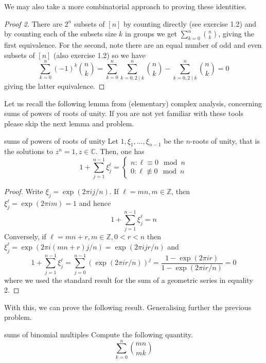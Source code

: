 \documentclass{article}
\begin{document}
We may also take a more combinatorial approach to proving these identities. 

\begin{proof}[Proof 2]
    There are $2^n$ subsets of $[n]$ by counting directly (see exercise 1.2) and by counting each of the subsets size $k$ in groups we get 
    $\sum_{k=0}^n \binom{n}{k}$, giving the first equivalence. For the second, note there are an equal number of odd and even subsets of $[n]$ 
    (also exercise 1.2) so we have 
    \[\sum_{k=0}^n (-1)^k \binom{n}{k} = \sum_{k=0}^n\sum_{k=0, 2 \mid k}^n \binom{n}{k} - \sum_{k=0, 2 \mid k}^{n} \binom{n}{k} = 0\]
    giving the latter equivalence.
\end{proof}

Let us recall the following lemma from (elementary) complex analysis, concerning sums of powers of roots of unity. If you are not yet familiar 
with these tools please skip the next lemma and problem.

\begin{lemma}[]{sums of powers of roots of unity}
    Let $1, \xi_1, \dots, \xi_{n-1}$ be the $n$-roots of unity, that is the solutions to $z^n = 1, z \in \mathbb{C}$. Then, one has 
    \[1 + \sum_{j=1}^{n-1} \xi_j^\ell = \begin{cases}n : \ell \equiv 0 \mod n \\ 0 : \ell \not\equiv 0 \mod n\end{cases}\]
\end{lemma}

\begin{proof}
    Write $\xi_j = \exp(2\pi i j/n)$. If $\ell = mn, m \in \mathbb{Z}$, then $\xi_j^\ell = \exp(2\pi i m) = 1$ and hence
    \[1 + \sum_{j=1}^{n-1}\xi_j^\ell = n\] 
    Conversely, if $\ell = mn + r, m \in \mathbb{Z}, 0 < r < n$ then $\xi_j^\ell = \exp(2\pi i (mn+r)j/n) = \exp(2\pi i jr/n)$ and 
    \[1 + \sum_{j=1}^{n-1} \xi_j^\ell = \sum_{j=0}^{n-1}\left(\exp(2\pi i r/n)\right)^j = \frac{1 - \exp(2\pi i r)}{1 - \exp(2\pi i r/n)} = 0\]
    where we used the standard result for the sum of a geometric series in equality 2. 
\end{proof}

With this, we can prove the following result. Generalising further the previous problem. 

\begin{problem}[]{sums of binomial multiples}
    Compute the following quantity. 
    \[\sum_{k=0}^n \binom{mn}{mk}\]
\end{problem}
\end{document}
